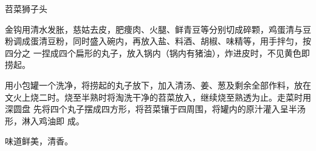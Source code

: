 %
%
%
%
%
%
%
\begin{recipe}{苕菜狮子头}

\ingredients


\preparation

\step 金钩用清水发胀，慈姑去皮，肥痩肉、火腿、鲜青豆等分别切成碎颗，鸡蛋清与豆
粉调成蛋清豆粉，同时盛入碗内，再放入盐、料酒、胡椒、味精等，用手拌匀，按四分之
一捏成四个扁形的丸子，放入锅内（锅内有猪油），炸进皮时，不见黄色即捞起。

\step 用小包罐一个洗净，将捞起的丸子放下，加入清汤、姜、葱及剩余全部作料，放在
文火上烧二时。烧至半熟时将淘洗干净的苕菜放入，继续烧至熟透为止。走菜时用深圆盘
先将四个丸子摆成四方形，将苕菜镶于四周围，将罐内的原汁灌入呈半汤形，淋入鸡油即
成。

\features

味道鲜美，清香。

\end{recipe}

